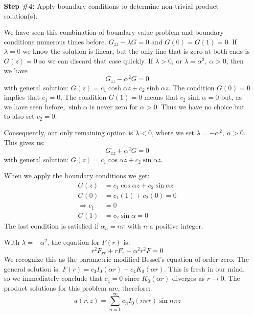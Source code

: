 \vspace{0.25cm}

\noindent\textbf{Step \#4:} Apply boundary conditions to determine non-trivial product solution(s).

\vspace{0.25cm}

\noindent We have seen this combination of boundary value problem and boundary conditions numerous times before.  $G_{zz}-\lambda G = 0$ and $G(0)=G(1)=0$.  If $\lambda=0$ we know the solution is linear, but the only line that is zero at both ends is $G(z)=0$ so we can discard that case quickly.  If $\lambda > 0$, or $\lambda = \alpha^2, \ \alpha>0$, then we have 
\begin{equation*}
G_{zz} - \alpha^2 G = 0
\end{equation*}
with general solution: $G(z) = c_1 \cosh{\alpha z} + c_2 \sinh{\alpha z}$.  The condition $G(0) = 0$ implies that $c_1 = 0$. The condition $G(1) = 0$ means that $c_2 \sinh{\alpha} = 0$ but, as we have seen before, $\sinh{\alpha}$ is never zero for $\alpha > 0$.  Thus we have no choice but to also set $c_2 = 0$.  

Consequently, our only remaining option is $\lambda < 0$, where we set $\lambda = -\alpha^2, \ \alpha > 0$.  This gives us:
\begin{equation*}
G_{zz} + \alpha^2 G = 0
\end{equation*}
with general solution: $G(z) = c_1 \cos{\alpha z} + c_2 \sin{\alpha z}$.

When we apply the boundary conditions we get:
\begin{align*}
G(z) &= c_1 \cos{\alpha z} + c_2 \sin{\alpha z} \\
G(0) &= c_1 (1) + c_2 (0) = 0 \\
\Rightarrow c_1 &= 0 \\ 
G(1) &= c_2 \sin{\alpha} = 0
\end{align*}
The last condition is satisfied if $\alpha_n = n \pi$ with $n$ a positive integer.  

\vspace{0.25cm}

\noindent With $\lambda = -\alpha^2$, the equation for $F(r)$ is:
\begin{equation*}
r^2F_{rr}+rF_r - \alpha^2r^2F = 0
\end{equation*}
We recognize this as the parametric modified Bessel's equation of order zero.  The general solution is: $F(r) = c_3I_0(\alpha r) + c_4 K_0(\alpha r)$.  This is fresh in our mind, so we immediately conclude that $c_4 = 0$ since $K_0(\alpha r)$ diverges as $r \to 0$.  The product solutions for this problem are, therefore:
\begin{equation}
u(r,z) = \sum\limits_{n=1}^{\infty} c_n I_0(n \pi r) \sin{n \pi z}
\label{eq:lec32-ex2-sol}
\end{equation}

